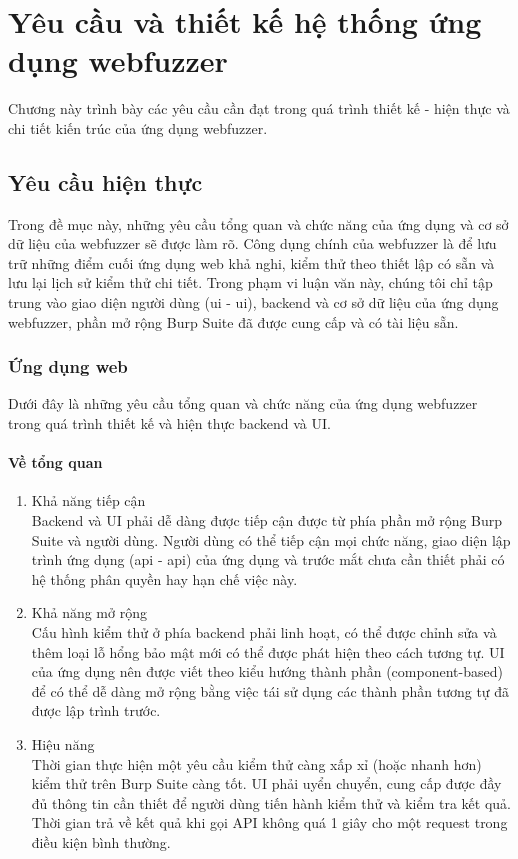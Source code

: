 \chapter{Yêu cầu và thiết kế hệ thống ứng dụng webfuzzer}
Chương này trình bày các yêu cầu cần đạt trong quá trình thiết kế - hiện thực và chi tiết kiến trúc của ứng dụng webfuzzer.
\section{Yêu cầu hiện thực}
Trong đề mục này, những yêu cầu tổng quan và chức năng của ứng dụng và cơ sở dữ liệu của webfuzzer sẽ được làm rõ. Công dụng chính của webfuzzer là để lưu trữ những điểm cuối ứng dụng web khả nghi, kiểm thử theo thiết lập có sẵn và lưu lại lịch sử kiểm thử chi tiết. Trong phạm vi luận văn này, chúng tôi chỉ tập trung vào giao diện người dùng (\acrfull{ui} - \acrshort{ui}), backend và cơ sở dữ liệu của ứng dụng webfuzzer, phần mở rộng Burp Suite đã được cung cấp và có tài liệu sẵn.
\subsection{Ứng dụng web}
Dưới đây là những yêu cầu tổng quan và chức năng của ứng dụng webfuzzer trong quá trình thiết kế và hiện thực backend và UI.
\subsubsection{Về tổng quan}
\begin{enumerate}
    \item Khả năng tiếp cận\\
    Backend và UI phải dễ dàng được tiếp cận được từ phía phần mở rộng Burp Suite và người dùng. Người dùng có thể tiếp cận mọi chức năng, giao diện lập trình ứng dụng (\acrlong{api} - \acrshort{api}) của ứng dụng và trước mắt chưa cần thiết phải có hệ thống phân quyền hay hạn chế việc này.
    \item Khả năng mở rộng\\
    Cấu hình kiểm thử ở phía backend phải linh hoạt, có thể được chỉnh sửa và thêm loại lỗ hổng bảo mật mới có thể được phát hiện theo cách tương tự. UI của ứng dụng nên được viết theo kiểu hướng thành phần (component-based) để có thể dễ dàng mở rộng bằng việc tái sử dụng các thành phần tương tự đã được lập trình trước.
    \item Hiệu năng\\
    Thời gian thực hiện một yêu cầu kiểm thử càng xấp xỉ (hoặc nhanh hơn) kiểm thử trên Burp Suite càng tốt. UI phải uyển chuyển, cung cấp được đầy đủ thông tin cần thiết để người dùng tiến hành kiểm thử và kiểm tra kết quả. Thời gian trả về kết quả khi gọi API không quá 1 giây cho một request trong điều kiện bình thường.
\end{enumerate}
